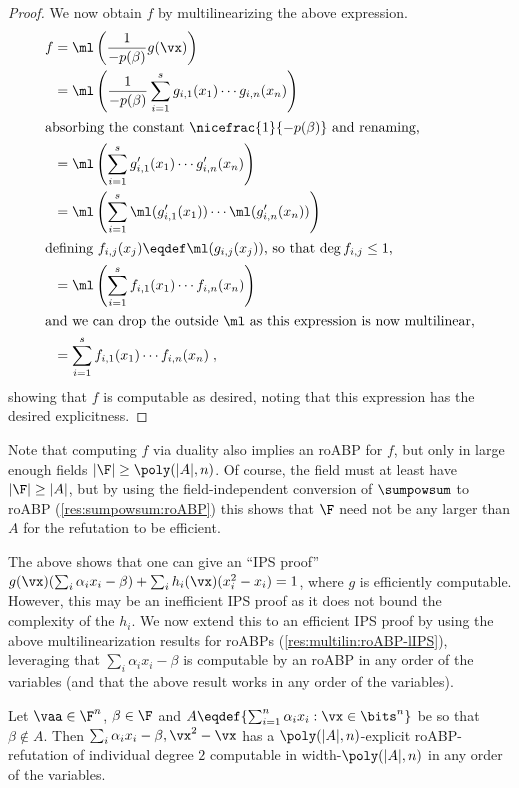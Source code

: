 \documentclass{toc}
\begin{document}
\begin{proof}
        We now obtain $f$ by multilinearizing the above expression.
        \begin{align*}
                f
                &=\ml\left(\frac{1}{-p(\beta)} g(\vx)\right)\\
                &=\ml\left(\frac{1}{-p(\beta)} \sum_{i=1}^{s} g_{i,1}(x_1)\cdots g_{i,n}(x_n)\right)\\
                \intertext{absorbing the constant $\nicefrac{1}{-p(\beta)}$ and renaming,}
                &=\ml\left(\sum_{i=1}^{s} g'_{i,1}(x_1)\cdots g'_{i,n}(x_n)\right)\\
                &=\ml\left(\sum_{i=1}^{s} \ml(g'_{i,1}(x_1))\cdots \ml(g'_{i,n}(x_n))\right)\\
                \intertext{defining $f_{i,j}(x_j)\eqdef \ml(g_{i,j}(x_j))$, so that $\deg f_{i,j}\le 1$,}
                &=\ml\left(\sum_{i=1}^{s} f_{i,1}(x_1)\cdots f_{i,n}(x_n)\right)\\
                \intertext{and we can drop the outside $\ml$ as this expression is now multilinear,}
                &=\sum_{i=1}^{s} f_{i,1}(x_1)\cdots f_{i,n}(x_n)
                \;,
        \end{align*}
        showing that $f$ is computable as desired, noting that this expression has the desired explicitness. %
\end{proof}

Note that computing $f$ via duality also implies an roABP for $f$, but only in large enough fields $|\F|\ge\poly(|A|,n)$.  Of course, the field must at least have $|\F|\ge |A|$, but by using the field-independent conversion of $\sumpowsum$ to roABP (\autoref{res:sumpowsum:roABP}) this shows that $\F$ need not be any larger than $A$ for the refutation to be efficient.

The above shows that one can give an ``IPS proof'' $g(\vx)(\sum_i \alpha_ix_i-\beta)+\sum_i h_i(\vx)(x_i^2-x_i)=1$, where $g$ is efficiently computable.  However, this may be an inefficient IPS proof as it does not bound the complexity of the $h_i$. We now extend this to an efficient IPS proof by using the above multilinearization results for roABPs (\autoref{res:multilin:roABP-lIPS}), leveraging that $\sum_i \alpha_ix_i-\beta$ is computable by an roABP in any order of the variables (and that the above result works in any order of the variables).

\begin{corollarywp}\label{res:ips-ubs:subset:roABP}
        Let $\vaa\in\F^n$, $\beta\in\F$ and $A\eqdef\{\sum_{i=1}^n \alpha_i x_i : \vx\in\bits^n\}$ be so that $\beta\notin A$.  Then $\sum_i \alpha_ix_i-\beta,\vx^2-\vx$ has a $\poly(|A|,n)$-explicit roABP-\lIPS refutation of individual degree $2$ computable in width-$\poly(|A|,n)$ in any order of the variables.
\end{corollarywp}
\end{document}

